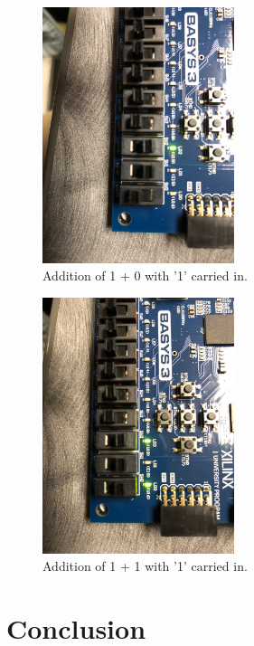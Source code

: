 \documentclass[11pt]{article}
\begin{document}
\begin{figure}[H]
\begin{center}
\includegraphics[width=0.5\textwidth]{report-images/Part3/IMG_0455.jpg}
\caption{Addition of 1 + 0  with '1' carried in.}
\label{fig:fullAdderImgSeven}
\end{center}
\end{figure}

\begin{figure}[H]
\begin{center}
\includegraphics[width=0.5\textwidth]{report-images/Part3/IMG_0456.jpg}
\caption{Addition of 1 + 1  with '1' carried in.}
\label{fig:fullAdderImgEight}
\end{center}
\end{figure}

\pagebreak

\section{Conclusion}
\end{document}
